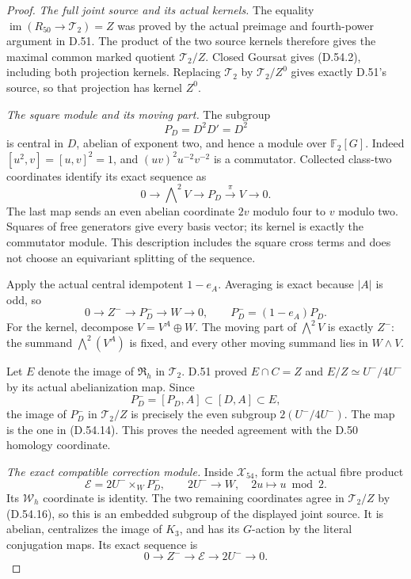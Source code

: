 \begin{proof}
\emph{The full joint source and its actual kernels.}
The equality
\(\operatorname{im}(R_{50}\to\mathcal T_2)=Z\)
was proved by the actual preimage and
fourth-power argument in D.51.
The product of the two source kernels
therefore gives the maximal common
marked quotient \(\mathcal T_2/Z\).
Closed Goursat gives (D.54.2), including
both projection kernels. Replacing
\(\mathcal T_2\) by \(\mathcal T_2/Z^0\)
gives exactly D.51's source, so that
projection has kernel \(Z^0\).

\emph{The square module and its moving part.}
The subgroup
\[
                     P_D=D^2D'=D^2
 \tag{D.54.13}
\]
is central in \(D\), abelian of exponent
two, and hence a module over
\(\mathbb F_2[G]\).
Indeed \([u^2,v]=[u,v]^2=1\), and
\((uv)^2u^{-2}v^{-2}\) is a commutator.
Collected class-two coordinates identify
its exact sequence as
\[
 0\longrightarrow\bigwedge\nolimits^2V
   \longrightarrow P_D
   \xrightarrow{\ \pi\ }V\longrightarrow0 .
 \tag{D.54.14}
\]
The last map sends an even abelian
coordinate \(2v\) modulo four to \(v\)
modulo two. Squares of free generators
give every basis vector; its kernel
is exactly the commutator module.
This description includes the square
cross terms and does not choose an
equivariant splitting of the sequence.

Apply the actual central idempotent
\(1-e_A\). Averaging is exact because
\(|A|\) is odd, so
\[
 0\longrightarrow Z^-\longrightarrow
       P_D^-\longrightarrow W\longrightarrow0,
       \qquad P_D^-=(1-e_A)P_D .
 \tag{D.54.15}
\]
For the kernel, decompose
\(V=V^A\oplus W\). The moving part of
\(\bigwedge^2V\) is exactly \(Z^-\):
the summand \(\bigwedge^2(V^A)\) is
fixed, and every other moving summand
lies in \(W\wedge V\).

Let \(E\) denote the image of
\(\mathfrak R_h\) in \(\mathcal T_2\).
D.51 proved \(E\cap C=Z\) and
\(E/Z\simeq U^-/4U^-\) by its actual
abelianization map. Since
\[
         P_D^-=[P_D,A]\subset[D,A]\subset E ,
 \tag{D.54.16}
\]
the image of \(P_D^-\) in
\(\mathcal T_2/Z\) is precisely
the even subgroup \(2(U^-/4U^-)\).
The map is the one in (D.54.14).
This proves the needed agreement with
the D.50 homology coordinate.

\emph{The exact compatible correction module.}
Inside \(\mathcal X_{54}\), form the
actual fibre product
\[
 \mathscr E=
    2U^-\times_W P_D^-,
 \qquad
  2U^-\longrightarrow W,\quad
       2u\longmapsto u\bmod2 .
 \tag{D.54.17}
\]
Its \(\mathcal W_h\) coordinate is
identity. The two remaining coordinates
agree in \(\mathcal T_2/Z\) by
(D.54.16), so this is an embedded
subgroup of the displayed joint source.
It is abelian, centralizes the image
of \(K_3\), and has its \(G\)-action
by the literal conjugation maps.
Its exact sequence is
\[
        0\longrightarrow Z^-\longrightarrow
        \mathscr E\longrightarrow2U^-
        \longrightarrow0 .
 \tag{D.54.18}
\]


\end{proof}
